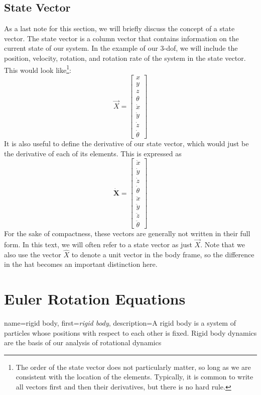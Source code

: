 \documentclass[12pt]{report}
\begin{document}
\subsection{State Vector}
As a last note for this section, we will briefly discuss the concept of a \gls{state vector}. The \gls{state vector} is a column vector that contains information on the current state of our system. In the example of our 3-\gls{dof}, we will include the position, velocity, rotation, and rotation rate of the system in the \gls{state vector}. This would look like\footnote{The order of the state vector does not particularly matter, so long as we are consistent with the location of the elements. Typically, it is common to write all vectors first and then their derivatives, but there is no hard rule.}:
$$\vec{X}=\begin{bmatrix}
    x\\y\\z\\\theta\\\dot{x}\\\dot{y}\\\dot{z}\\\dot{\theta}
\end{bmatrix}$$
It is also useful to define the derivative of our \gls{state vector}, which would just be the derivative of each of its elements. This is expressed as
$$\dot{\textbf{X}}=\begin{bmatrix}
    \dot{x}\\\dot{y}\\\dot{z}\\\dot{\theta}\\\ddot{x}\\\ddot{y}\\\ddot{z}\\\ddot{\theta}
\end{bmatrix}$$
For the sake of compactness, these vectors are generally not written in their full form. In this text, we will often refer to a \gls{state vector} as just $\vec{X}$. Note that we also use the vector $\hat{X}$ to denote a unit vector in the body frame, so the difference in the hat becomes an important distinction here.
\section{Euler Rotation Equations}\label{Euler Rotation Equations}
{
    name=rigid body,
    first=\textit{rigid body},
    description={A rigid body is a system of particles whose positions with respect to each other is fixed. Rigid body dynamics are the basis of our analysis of rotational dynamics}
}
\end{document}
